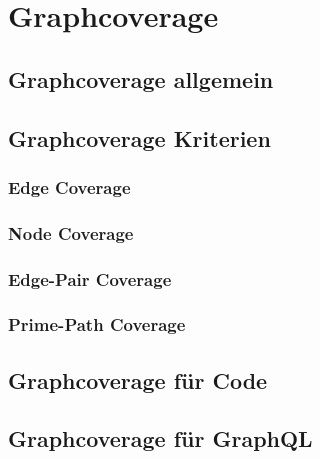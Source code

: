 \section{Graphcoverage}

\subsection{Graphcoverage allgemein}

\subsection{Graphcoverage Kriterien}
    \subsubsection{Edge Coverage}

    \subsubsection{Node Coverage}

    \subsubsection{Edge-Pair Coverage}

    \subsubsection{Prime-Path Coverage}

\subsection{Graphcoverage für Code}

\subsection{Graphcoverage für GraphQL}




